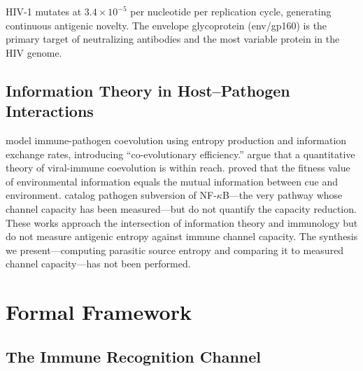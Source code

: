 \documentclass[twocolumn,10pt]{article}
\begin{document}
HIV-1 mutates at $3.4 \times 10^{-5}$ per nucleotide per replication cycle, generating continuous antigenic novelty.  The envelope glycoprotein (env/gp160) is the primary target of neutralizing antibodies and the most variable protein in the HIV genome.

\subsection{Information Theory in Host--Pathogen Interactions}

\citet{bellamy2024} model immune-pathogen coevolution using entropy production and information exchange rates, introducing ``co-evolutionary efficiency.''  \citet{mora2023} argue that a quantitative theory of viral-immune coevolution is within reach.  \citet{bergstrom2005} proved that the fitness value of environmental information equals the mutual information between cue and environment.  \citet{rahman2011} catalog pathogen subversion of NF-$\kappa$B---the very pathway whose channel capacity has been measured---but do not quantify the capacity reduction.  These works approach the intersection of information theory and immunology but do not measure antigenic entropy against immune channel capacity.  The synthesis we present---computing parasitic source entropy and comparing it to measured channel capacity---has not been performed.

\section{Formal Framework}
\label{sec:framework}

\subsection{The Immune Recognition Channel}
\end{document}
